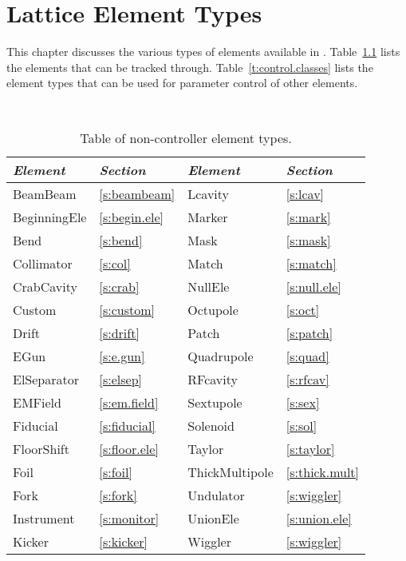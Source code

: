 \chapter{Lattice Element Types}
\label{c:ele.types}


This chapter discusses the various types of elements
available in \accellat.
Table~\ref{t:particle.classes} lists the elements that can be tracked through.
Table~\ref{t:control.classes} lists the  element types that can be used for parameter
control of other elements. 

\begin{table}[htb]
\centering
{\tt
\begin{tabular}{llll} \toprule
  {\it Element}    & {\it Section}         & {\it Element}      & {\it Section}       \\ \midrule
  BeamBeam         & \ref{s:beambeam}      &  Lcavity          & \ref{s:lcav}         \\
  BeginningEle     & \ref{s:begin.ele}     &  Marker            & \ref{s:mark}        \\
  Bend             & \ref{s:bend}          &  Mask              & \ref{s:mask}        \\
  Collimator       & \ref{s:col}           &  Match             & \ref{s:match}       \\ 
  CrabCavity       & \ref{s:crab}          &  NullEle           & \ref{s:null.ele}    \\
  Custom           & \ref{s:custom}        &  Octupole          & \ref{s:oct}         \\
  Drift            & \ref{s:drift}         &  Patch             & \ref{s:patch}       \\  
  EGun             & \ref{s:e.gun}         &  Quadrupole        & \ref{s:quad}        \\ 
  ElSeparator      & \ref{s:elsep}         &  RFcavity          & \ref{s:rfcav}       \\ 
  EMField          & \ref{s:em.field}      &  Sextupole         & \ref{s:sex}         \\ 
  Fiducial         & \ref{s:fiducial}      &  Solenoid          & \ref{s:sol}         \\
  FloorShift       & \ref{s:floor.ele}     &  Taylor            & \ref{s:taylor}      \\
  Foil             & \ref{s:foil}          &  ThickMultipole    & \ref{s:thick.mult}  \\
  Fork             & \ref{s:fork}          &  Undulator         & \ref{s:wiggler}     \\
  Instrument       & \ref{s:monitor}       &  UnionEle          & \ref{s:union.ele}   \\
  Kicker           & \ref{s:kicker}        &  Wiggler           & \ref{s:wiggler}     \\
  \bottomrule
\end{tabular}
} 
\caption{Table of non-controller element types.}
\label{t:particle.classes}
\end{table}

